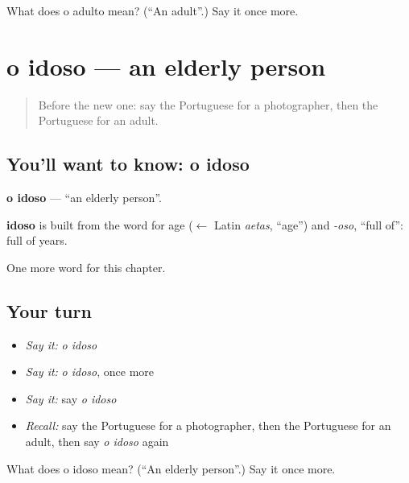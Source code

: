 \begin{tcolorbox}[breakable,colback=teal!4,colframe=teal!35!black,title={Before you move on}]
What does o adulto mean? (\textquotedblleft{}An adult\textquotedblright{}.) Say it once more.
\end{tcolorbox}
\section[o idoso]{o idoso — an elderly person}

\label{lesson:PT-C191-idoso}



\begin{quote}
Before the new one: say the Portuguese for a photographer, then the Portuguese for an adult.
\end{quote}

\subsection*{You'll want to know: o idoso}
\textbf{o idoso} — \textquotedblleft{}an elderly person\textquotedblright{}.

\begin{cousinweb}
\textbf{idoso} is built from the word for age ($\leftarrow$ Latin \emph{aetas}, \textquotedblleft{}age\textquotedblright{}) and \emph{-oso}, \textquotedblleft{}full of\textquotedblright{}: full of years.
\end{cousinweb}

\begin{grammarlens}[title={What you've built}]
One more word for this chapter.
\end{grammarlens}

\subsection*{Your turn}
\begin{itemize}
\raggedright
  \item \emph{Say it:} \emph{o idoso}
  \item \emph{Say it:} \emph{o idoso}, once more
  \item \emph{Say it:} say \emph{o idoso}
  \item \emph{Recall:} say the Portuguese for a photographer, then the Portuguese for an adult, then say \emph{o idoso} again
\end{itemize}

\begin{tcolorbox}[breakable,colback=teal!4,colframe=teal!35!black,title={Before you move on}]
What does o idoso mean? (\textquotedblleft{}An elderly person\textquotedblright{}.) Say it once more.
\end{tcolorbox}
